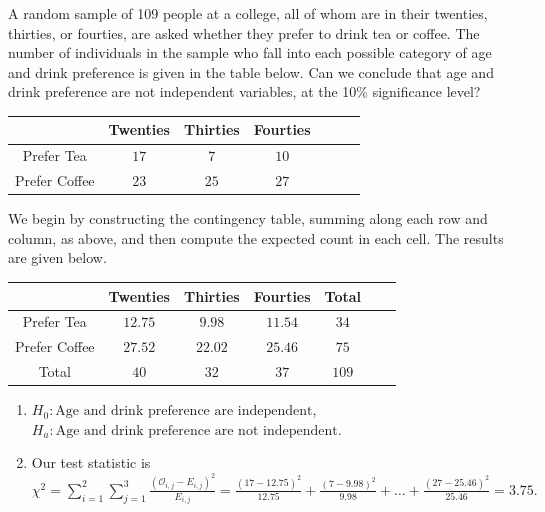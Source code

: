 \begin{example}
A random sample of 109 people at a college, all of whom are in their twenties, thirties, or fourties, are asked whether they prefer to drink tea or coffee. The number of individuals in the sample who fall into each possible category of age and drink preference is given in the table below. Can we conclude that age and drink preference are not independent variables, at the 10\% significance level?
\renewcommand{\arraystretch}{1.25}
\begin{center}
\begin{tabular}{|c|c|c|c|c|c|c|}
\hline
 & Twenties & Thirties & Fourties \\
\hline
Prefer Tea & $17$ & $7$ & $10$  \\
\hline
Prefer Coffee & $23$ & $25$ & $27$ \\
\hline
\end{tabular}
\end{center}

We begin by constructing the contingency table, summing along each row and column, as above, and then compute the expected count in each cell. The results are given below.
\renewcommand{\arraystretch}{1.25}
\begin{center}
\begin{tabular}{|c|c|c|c|c|c|c|}
\hline
 & Twenties & Thirties & Fourties & Total \\
\hline
Prefer Tea & $12.75$ & $9.98$ & $11.54$ & $34$  \\
\hline
Prefer Coffee & $27.52$ & $22.02$ & $25.46$ & $75$ \\
\hline
Total & $40$ & $32$ & $37$  & $109$  \\
\hline
\end{tabular}
\end{center}

\begin{enumerate}[label=\textnormal{\Roman*}.]
\item $H_0: \text{Age and drink preference are independent}$, $H_a: \text{Age and drink preference are not independent}$.

\item Our test statistic is $\chi^2 = \sum_{i=1}^2\sum_{j=1}^3 \frac{(\mathcal{O}_{i,j} - E_{i,j})^2}{E_{i,j}} = \frac{(17-12.75)^2}{12.75} + \frac{(7-9.98)^2}{9.98} + \dots + \frac{(27-25.46)^2}{25.46} = 3.75.$ \\


\end{enumerate}
\end{example}
